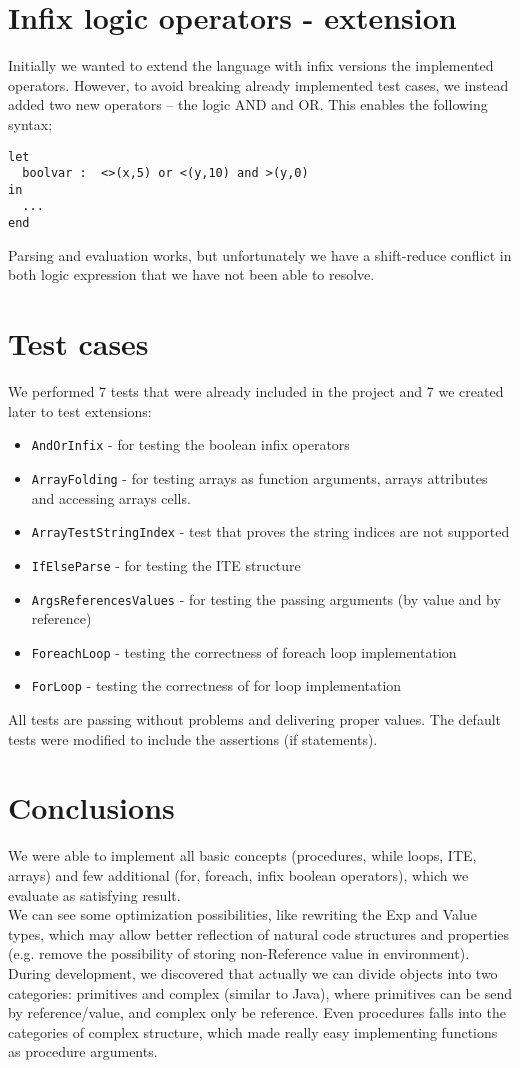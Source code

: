 \documentclass[10pt]{scrartcl}
\begin{document}
\section{Infix logic operators - extension}
Initially we wanted to extend the language with infix versions the implemented operators. However, to avoid breaking already implemented test cases, we instead added two new operators -- the logic AND and OR. This enables the following syntax;
\begin{lstlisting}
let
  boolvar :  <>(x,5) or <(y,10) and >(y,0)
in
  ...
end
\end{lstlisting}
Parsing and evaluation works, but unfortunately we have a shift-reduce conflict in both logic expression that we have not been able to resolve.
\section{Test cases}
We performed 7 tests that were already included in the project and 7 we created later to test extensions:
\begin{itemize}
\item \texttt{AndOrInfix} - for testing the boolean infix operators
\item \texttt{ArrayFolding} - for testing arrays as function arguments, arrays attributes and accessing arrays cells.
\item \texttt{ArrayTestStringIndex} - test that proves the string indices are not supported
\item \texttt{IfElseParse} - for testing the ITE structure
\item \texttt{ArgsReferencesValues} - for testing the passing arguments (by value and by reference)
\item \texttt{ForeachLoop} - testing the correctness of foreach loop implementation
\item \texttt{ForLoop} - testing the correctness of for loop implementation
\end{itemize}
All tests are passing without problems and delivering proper values. 
The default tests were modified to include the assertions (if statements).

\section{Conclusions}
We were able to implement all basic concepts (procedures, while loops, ITE, arrays) and few additional (for, foreach, infix boolean operators), which we evaluate as satisfying result. \\
We can see some optimization possibilities, like rewriting the Exp and Value types, which may allow better reflection of natural code structures and properties (e.g. remove the possibility of storing non-Reference value in environment). \\
During development, we discovered that actually we can divide objects into two categories: primitives and complex (similar to Java), where primitives can be send by reference/value, and complex only be reference. Even procedures falls into the categories of complex structure, which made really easy implementing functions as procedure arguments. 
\end{document}

